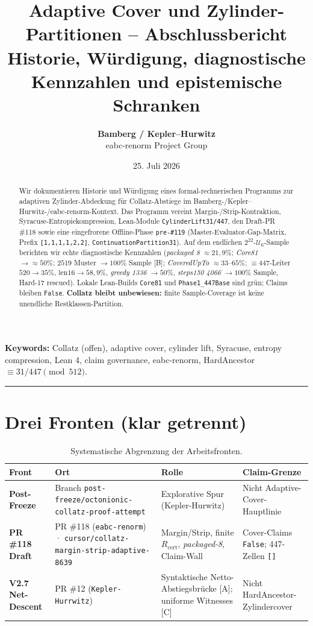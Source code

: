 \documentclass[11pt,a4paper]{article}
\title{\textbf{Adaptive Cover und Zylinder-Partitionen -- Abschlussbericht}\\[0.5em]
	\large Historie, Würdigung, diagnostische Kennzahlen und epistemische Schranken}
\author{\textbf{Bamberg / Kepler--Hurwitz} \\ \small eabc-renorm Project Group}
\date{25. Juli 2026}
\theoremstyle{definition}
\theoremstyle{remark}
\newcommand{\U}{\mathcal{U}} %
\begin{document}
	
	\maketitle
	
	\begin{abstract}
		Wir dokumentieren Historie und Würdigung eines formal-rechnerischen Programms zur adaptiven Zylinder-Abdeckung für Collatz-Abstiege im Bamberg-/Kepler--Hurwitz-/eabc-renorm-Kontext. Das Programm vereint Margin-/Strip-Kontraktion, Syracuse-Entropiekompression, Lean-Module \texttt{CylinderLift31/447}, den Draft-PR \#118 sowie eine eingefrorene Offline-Phase \texttt{pre-\#119} (Master-Evaluator-Gap-Matrix, Prefix \texttt{[1,1,1,1,2,2]}, \texttt{ContinuationPartition31}). Auf dem endlichen $2^{22}$-$\U_6$-Sample berichten wir echte diagnostische Kennzahlen (\textit{packaged 8} $\approx 21{,}9\%$; \textit{Core81} $\to \approx 50\%$; $2519$ Muster $\to 100\%$ Sample [B]; \textit{CoveredUpTo} $\approx 33$--$65\%$; $\equiv 447$-Leiter $520 \to 35\%$, $\mathrm{len}16 \to 58{,}9\%$, \textit{greedy 1336} $\to 50\%$, \textit{steps150 4066} $\to 100\%$ Sample, Hard-17 rescued). Lokale Lean-Builds \texttt{Core81} und \texttt{Phase1\_447Base} sind grün; Claims bleiben \texttt{False}. \textbf{Collatz bleibt unbewiesen:} finite Sample-Coverage ist keine unendliche Restklassen-Partition.
	\end{abstract}
	
	\noindent\textbf{Keywords:} Collatz (offen), adaptive cover, cylinder lift, Syracuse, entropy compression, Lean 4, claim governance, eabc-renorm, HardAncestor $\equiv 31/447 \pmod{512}$.
	
	\bigskip
	\hrule
	\bigskip
	
	\section{Drei Fronten (klar getrennt)}
	
	\begin{table}[h!]
		\centering
		\small
		\begin{tabular}{p{2.5cm} p{4.5cm} p{4.5cm} p{3.5cm}}
			\toprule
			\textbf{Front} & \textbf{Ort} & \textbf{Rolle} & \textbf{Claim-Grenze} \\
			\midrule
			\textbf{Post-Freeze} & Branch \texttt{post-freeze/octonionic-collatz-proof-attempt} & Explorative Spur (Kepler-Hurwitz) & Nicht Adaptive-Cover-Hauptlinie \\
			\addlinespace
			\textbf{PR \#118 Draft} & PR \#118 (\texttt{eabc-renorm}) · \texttt{cursor/collatz-margin-strip-adaptive-8639} & Margin/Strip, finite $R_{\mathrm{cert}}$, \textit{packaged-8}, Claim-Wall & Cover-Claims \texttt{False}; 447-Zellen \texttt{[]} \\
			\addlinespace
			\textbf{V2.7 Net-Descent} & PR \#12 (\texttt{Kepler-Hurrwitz}) & Syntaktische Netto-Abstiegsbrücke [A]; uniforme Witnesses [C] & Nicht HardAncestor-Zylindercover \\
			\bottomrule
		\end{tabular}
		\caption{Systematische Abgrenzung der Arbeitsfronten.}
	\end{table}
	
\end{document}
